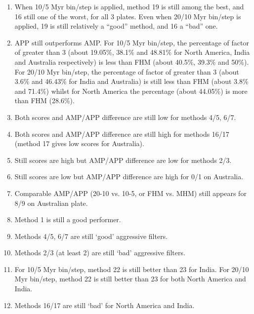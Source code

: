 \begin{enumerate}
  \item When 10/5 Myr bin/step is applied, method 19 is still among the best,
	and 16 still one of the worst, for all 3 plates. Even when 20/10 Myr
	bin/step is applied, 19 is still relatively a ``good'' method, and 16 a
	``bad'' one.
  \item APP still outperforms AMP\@. For 10/5 Myr bin/step, the percentage of
	factor of greater than 3 (about 19.05\%, 38.1\% and 48.81\% for North
	America, India and Australia respectively) is less than FHM (about 40.5\%,
	39.3\% and 50\%). For 20/10 Myr bin/step, the percentage of factor of
	greater than 3 (about 3.6\% and 46.43\% for India and Australia) is still
	less than FHM (about 3.8\% and 71.4\%) whilst for North America the
	percentage (about 44.05\%) is more than FHM (28.6\%).
  \item Both scores and AMP/APP difference are still low for methods 4/5, 6/7.
  \item Both scores and AMP/APP difference are still high for methods 16/17
	(method 17 gives low scores for Australia).
  \item Still scores are high but AMP/APP difference are low for methods 2/3.
  \item Still scores are low but AMP/APP difference are high for 0/1 on
	Australia.
  \item Comparable AMP/APP (20-10 vs. 10-5, or FHM vs. MHM) still appears for
	8/9 on Australian plate.
  \item Method 1 is still a good performer.
  \item Methods 4/5, 6/7 are still `good' aggressive filters.
  \item Methods 2/3 (at least 2) are still `bad' aggressive filters.
  \item For 10/5 Myr bin/step, method 22 is still better than 23 for India. For
	20/10 Myr bin/step, method 22 is still better than 23 for both North
	America and India.
  \item Methods 16/17 are still `bad' for North America and India.
\end{enumerate}

